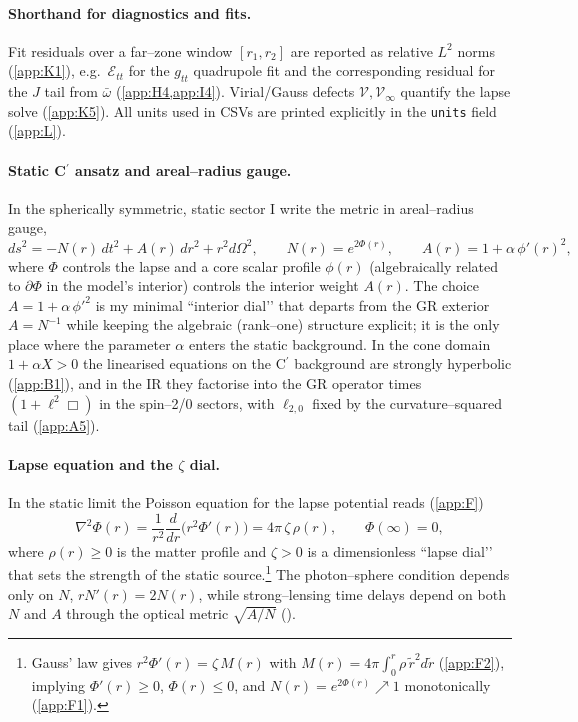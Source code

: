 \documentclass{iopjournal}
\begin{document}
\paragraph{Shorthand for diagnostics and fits.}
Fit residuals over a far–zone window $[r_1,r_2]$ are reported as relative $L^2$ norms (\cref{app:K1}), e.g.\ $\mathcal E_{tt}$ for the $g_{tt}$ quadrupole fit and the corresponding residual for the $J$ tail from $\bar\omega$ (\cref{app:H4,app:I4}). Virial/Gauss defects $\mathcal V,\mathcal V_\infty$ quantify the lapse solve (\cref{app:K5}). All units used in CSVs are printed explicitly in the \texttt{units} field (\cref{app:L}).

\paragraph{Static C$^\prime$ ansatz and areal–radius gauge.}
In the spherically symmetric, static sector I write the metric in areal–radius gauge,
\begin{equation}
ds^2=-N(r)\,dt^2+A(r)\,dr^2+r^2 d\Omega^2,\qquad
N(r)=e^{2\Phi(r)},\qquad
A(r)=1+\alpha\,\phi'(r)^{2},
\label{eq:model_Cprime}
\end{equation}
where $\Phi$ controls the lapse and a core scalar profile $\phi(r)$ (algebraically related to $\partial\Phi$ in the model’s interior) controls the interior weight $A(r)$. The choice $A=1+\alpha\,\phi'^2$ is my minimal ``interior dial’’ that departs from the GR exterior $A=N^{-1}$ while keeping the algebraic (rank–one) structure explicit; it is the only place where the parameter $\alpha$ enters the static background.
In the cone domain $1+\alpha X>0$ the linearised equations on the C$^\prime$ background are strongly hyperbolic (\cref{app:B1}), and in the IR they factorise into the GR operator times $(1+\ell^2\Box)$ in the spin–2/0 sectors, with $\ell_{2,0}$ fixed by the curvature–squared tail (\cref{app:A5}).

\paragraph{Lapse equation and the $\zeta$ dial.}
In the static limit the Poisson equation for the lapse potential reads (\cref{app:F})
\begin{equation}
\nabla^2\Phi(r)=\frac{1}{r^2}\frac{d}{dr}\!\Big(r^2\Phi'(r)\Big)=4\pi\,\zeta\,\rho(r),
\qquad
\Phi(\infty)=0,
\label{eq:model_PhiPoisson}
\end{equation}
where $\rho(r)\ge0$ is the matter profile and $\zeta>0$ is a dimensionless ``lapse dial’’ that sets the strength of the static source.\footnote{Gauss’ law gives $r^{2}\Phi'(r)=\zeta\,M(r)$ with $M(r)=4\pi\!\int_0^r\rho\,\tilde r^2d\tilde r$ (\cref{app:F2}), implying $\Phi'(r)\ge0$, $\Phi(r)\le0$, and $N(r)=e^{2\Phi(r)}\nearrow1$ monotonically (\cref{app:F1}).} The photon–sphere condition depends only on $N$,
$rN'(r)=2N(r)$, while strong–lensing time delays depend on both $N$ and $A$ through the optical metric $\sqrt{A/N}$ ().
\end{document}
